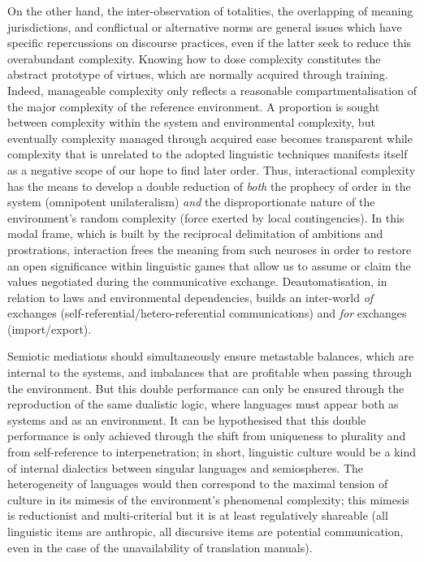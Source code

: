 \documentclass[output=paper]{langscibook}
\begin{document}
On the other hand, the inter-observation of totalities, the overlapping of meaning jurisdictions, and conflictual or alternative norms are general issues which have specific repercussions on discourse practices, even if the latter seek to reduce this overabundant complexity. Knowing how to dose complexity constitutes the abstract prototype of virtues, which are normally acquired through training. Indeed, manageable complexity only reflects a reasonable compartmentalisation of the major complexity of the reference environment. A proportion is sought between complexity within the system and environmental complexity, but eventually complexity managed through acquired ease becomes transparent while complexity that is unrelated to the adopted linguistic techniques manifests itself as a negative scope of our hope to find later order. Thus, interactional complexity has the means to develop a double reduction of \textit{both} the prophecy of order in the system (omnipotent unilateralism) \textit{and} the disproportionate nature of the environment’s random complexity (force exerted by local contingencies). In this modal frame, which is built by the reciprocal delimitation of ambitions and prostrations, interaction frees the meaning from such neuroses in order to restore an open significance within linguistic games that allow us to assume or claim the values negotiated during the communicative exchange. Deautomatisation, in relation to laws and environmental dependencies, builds an inter-world \textit{of} exchanges (self-referential\slash hetero-referential communications) and \textit{for} exchanges (import\slash export). 

\begin{sloppypar}
Semiotic mediations should simultaneously ensure metastable balances, which are internal to the systems, and imbalances that are profitable when passing through the environment. But this double performance can only be ensured through the reproduction of the same dualistic logic, where languages must appear both as systems and as an environment. It can be hypothesised that this double performance is only achieved through the shift from uniqueness to plurality and from self-reference to interpenetration; in short, linguistic culture would be a kind of internal dialectics between singular languages and semiospheres. The heterogeneity of languages would then correspond to the maximal tension of culture in its mimesis of the environment’s phenomenal complexity; this mimesis is reductionist and multi-criterial but it is at least regulatively shareable (all linguistic items are anthropic, all discursive items are potential communication, even in the case of the unavailability of translation manuals). 
\end{sloppypar}
\end{document}

